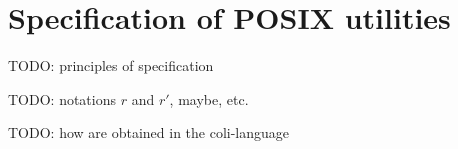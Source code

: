 
\section{Specification of POSIX utilities}
\label{sec:spec}

TODO: principles of specification

TODO: notations $r$ and $r'$, maybe, etc.

TODO: how are obtained in the coli-language